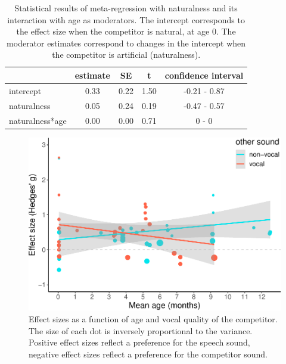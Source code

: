 \documentclass[
  english,
  man]{apa6}
\begin{document}
\begin{table}[tbp]

\begin{center}
\begin{threeparttable}

\caption{\label{tab:TableNatural}Statistical results of meta-regression with naturalness and its interaction with age as moderators. The intercept corresponds to the effect size when the competitor is natural, at age 0. The moderator estimates correspond to changes in the intercept when the competitor is artificial (naturalness).}

\begin{tabular}{lcccc}
\toprule
 & estimate & SE & t & confidence interval\\
\midrule
intercept & 0.33 & 0.22 & 1.50 & -0.21 - 0.87\\
naturalness & 0.05 & 0.24 & 0.19 & -0.47 - 0.57\\
naturalness*age & 0.00 & 0.00 & 0.71 & 0 - 0\\
\bottomrule
\end{tabular}

\end{threeparttable}
\end{center}

\end{table}

\begin{figure}
\centering
\includegraphics{MA_speech_pref_files/figure-latex/vocal-1.pdf}
\caption{\label{fig:vocal}Effect sizes as a function of age and vocal quality of the competitor. The size of each dot is inversely proportional to the variance. Positive effect sizes reflect a preference for the speech sound, negative effect sizes reflect a preference for the competitor sound.}
\end{figure}
\end{document}
